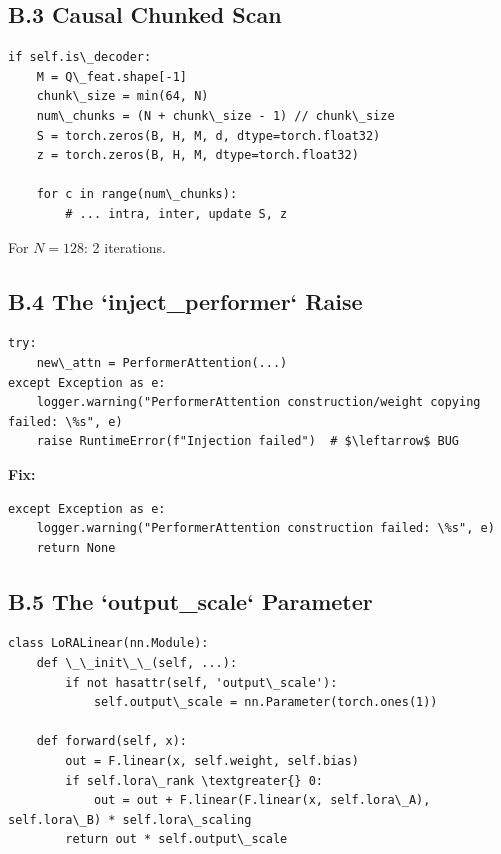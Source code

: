\subsection{B.3 Causal Chunked Scan}

\begin{lstlisting}
if self.is\_decoder:
    M = Q\_feat.shape[-1]
    chunk\_size = min(64, N)
    num\_chunks = (N + chunk\_size - 1) // chunk\_size
    S = torch.zeros(B, H, M, d, dtype=torch.float32)
    z = torch.zeros(B, H, M, dtype=torch.float32)
    
    for c in range(num\_chunks):
        # ... intra, inter, update S, z
\end{lstlisting}

For $N = 128$: 2 iterations.

\subsection{B.4 The `inject\_performer` Raise}

\begin{lstlisting}
try:
    new\_attn = PerformerAttention(...)
except Exception as e:
    logger.warning("PerformerAttention construction/weight copying failed: \%s", e)
    raise RuntimeError(f"Injection failed")  # $\leftarrow$ BUG
\end{lstlisting}

\textbf{Fix:}

\begin{lstlisting}
except Exception as e:
    logger.warning("PerformerAttention construction failed: \%s", e)
    return None
\end{lstlisting}

\subsection{B.5 The `output\_scale` Parameter}

\begin{lstlisting}
class LoRALinear(nn.Module):
    def \_\_init\_\_(self, ...):
        if not hasattr(self, 'output\_scale'):
            self.output\_scale = nn.Parameter(torch.ones(1))
    
    def forward(self, x):
        out = F.linear(x, self.weight, self.bias)
        if self.lora\_rank \textgreater{} 0:
            out = out + F.linear(F.linear(x, self.lora\_A), self.lora\_B) * self.lora\_scaling
        return out * self.output\_scale
\end{lstlisting}

